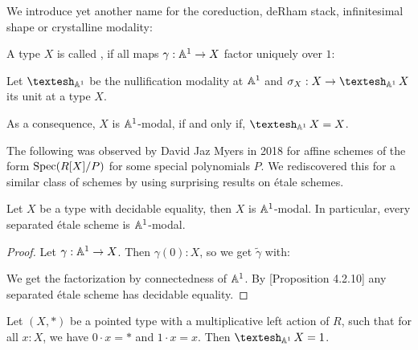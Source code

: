 
We introduce yet another name for the coreduction, deRham stack, infinitesimal shape or crystalline modality:

\begin{definition}
  A type $X$ is called , if all maps $\gamma:\mathbb{A}^1\to X$ factor uniquely over $1$:
  \begin{center}
  \end{center}
\end{definition}

\begin{definition}
  Let $\shape_{\A^1}$ be the nullification modality at $\mathbb{A}^1$ and $\sigma_X:X\to \shape_{\A^1}X$ its unit at a type $X$. 
\end{definition}

As a consequence, $X$ is $\mathbb{A}^1$-modal, if and only if, $\shape_{\A^1}X=X$.

The following was observed by David Jaz Myers in 2018 for affine schemes of the form $\operatorname{Spec} (R[X]/P)$ for some special polynomials $P$.
We rediscovered this for a similar class of schemes by using surprising results on étale schemes.

\begin{proposition}
  Let $X$ be a type with decidable equality, then $X$ is $\mathbb{A}^1$-modal.
  In particular, every separated étale scheme is $\mathbb{A}^1$-modal.
\end{proposition}

\begin{proof}
  Let $\gamma:\mathbb{A}^1\to X$.
  Then $\gamma(0):X$, so we get $\tilde{\gamma}$ with:
  \begin{center}
  \end{center}
  We get the factorization by connectedness of $\mathbb{A}^1$.
  By \cite{etale-draft}[Proposition 4.2.10] any separated étale scheme has decidable equality.
\end{proof}

\begin{lemma}
  Let $(X,*)$ be a pointed type with a multiplicative left action of $R$,
  such that for all $x:X$, we have $0\cdot x=*$ and $1\cdot x=x$.
  Then $\shape_{\A^1}X=1$.
\end{lemma}

